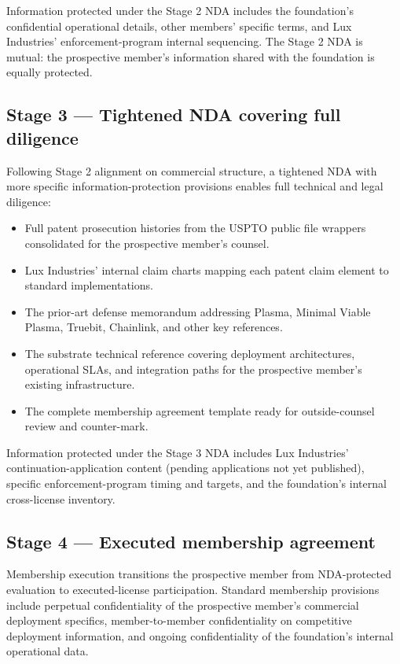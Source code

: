 \documentclass[11pt,letterpaper]{article}
\begin{document}
Information protected under the Stage 2 NDA includes the foundation's confidential operational details, other members' specific terms, and Lux Industries' enforcement-program internal sequencing. The Stage 2 NDA is mutual: the prospective member's information shared with the foundation is equally protected.

\subsection{Stage 3 --- Tightened NDA covering full diligence}

Following Stage 2 alignment on commercial structure, a tightened NDA with more specific information-protection provisions enables full technical and legal diligence:

\begin{itemize}
\item Full patent prosecution histories from the USPTO public file wrappers consolidated for the prospective member's counsel.
\item Lux Industries' internal claim charts mapping each patent claim element to standard implementations.
\item The prior-art defense memorandum addressing Plasma, Minimal Viable Plasma, Truebit, Chainlink, and other key references.
\item The substrate technical reference covering deployment architectures, operational SLAs, and integration paths for the prospective member's existing infrastructure.
\item The complete membership agreement template ready for outside-counsel review and counter-mark.
\end{itemize}

Information protected under the Stage 3 NDA includes Lux Industries' continuation-application content (pending applications not yet published), specific enforcement-program timing and targets, and the foundation's internal cross-license inventory.

\subsection{Stage 4 --- Executed membership agreement}

Membership execution transitions the prospective member from NDA-protected evaluation to executed-license participation. Standard membership provisions include perpetual confidentiality of the prospective member's commercial deployment specifics, member-to-member confidentiality on competitive deployment information, and ongoing confidentiality of the foundation's internal operational data.
\end{document}
